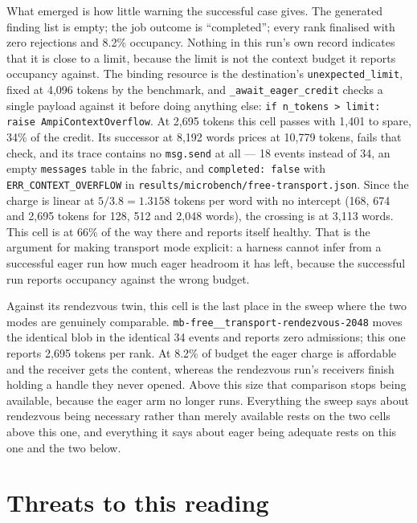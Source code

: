 \documentclass[11pt]{article}
\begin{document}
What emerged is how little warning the successful case gives. The generated finding
list is empty; the job outcome is ``completed''; every rank finalised with zero
rejections and 8.2\% occupancy. Nothing in this run's own record indicates that it is
close to a limit, because the limit is not the context budget it reports occupancy
against. The binding resource is the destination's \texttt{unexpected\_limit}, fixed
at 4{,}096 tokens by the benchmark, and \texttt{\_await\_eager\_credit} checks a
single payload against it before doing anything else: \texttt{if n\_tokens > limit:
raise AmpiContextOverflow}. At 2{,}695 tokens this cell passes with 1{,}401 to spare,
34\% of the credit. Its successor at 8{,}192 words prices at 10{,}779 tokens, fails
that check, and its trace contains no \texttt{msg.send} at all --- 18 events instead
of 34, an empty \texttt{messages} table in the fabric, and \texttt{completed: false}
with \texttt{ERR\_CONTEXT\_OVERFLOW} in \texttt{results/microbench/free-transport.json}.
Since the charge is linear at $5/3.8 = 1.3158$ tokens per word with no intercept
(168, 674 and 2{,}695 tokens for 128, 512 and 2{,}048 words), the crossing is at
3{,}113 words. This cell is at 66\% of the way there and reports itself healthy. That
is the argument for making transport mode explicit: a harness cannot infer from a
successful eager run how much eager headroom it has left, because the successful run
reports occupancy against the wrong budget.

Against its rendezvous twin, this cell is the last place in the sweep where the two
modes are genuinely comparable. \texttt{mb-free\_\_transport-rendezvous-2048} moves
the identical blob in the identical 34 events and reports zero admissions; this one
reports 2{,}695 tokens per rank. At 8.2\% of budget the eager charge is affordable
and the receiver gets the content, whereas the rendezvous run's receivers finish
holding a handle they never opened. Above this size that comparison stops being
available, because the eager arm no longer runs. Everything the sweep says about
rendezvous being necessary rather than merely available rests on the two cells above
this one, and everything it says about eager being adequate rests on this one and the
two below.

\section{Threats to this reading}
\end{document}
